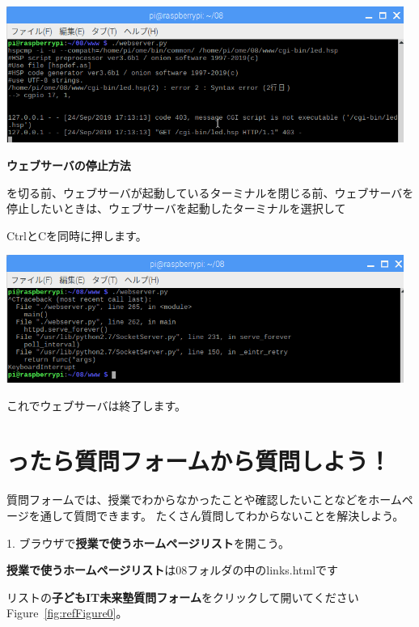 \begin{center}
\includegraphics[width=13cm]{./text08-img/textbook-img065.png}

\end{center}
{\bfseries
ウェブサーバの停止方法}

を切る前、ウェブサーバが起動しているターミナルを閉じる前、ウェブサーバを停止したいときは、ウェブサーバを起動したターミナルを選択して

CtrlとCを同時に押します。



\begin{center}
\includegraphics[width=13cm]{./text08-img/textbook-img066.png}

\end{center}
これでウェブサーバは終了します。

\section{ったら質問フォームから質問しよう！}
質問フォームでは、授業でわからなかったことや確認したいことなどをホームページを通して質問できます。
たくさん質問してわからないことを解決しよう。

1.
ブラウザで\textbf{授業で使うホームページリスト}を開こう。

\textbf{授業で使うホームページリスト}は08フォルダの中のlinks.htmlです

リストの\textbf{子どもIT未来塾質問フォーム}をクリックして開いてくださいFigure~\ref{fig:refFigure0}。



